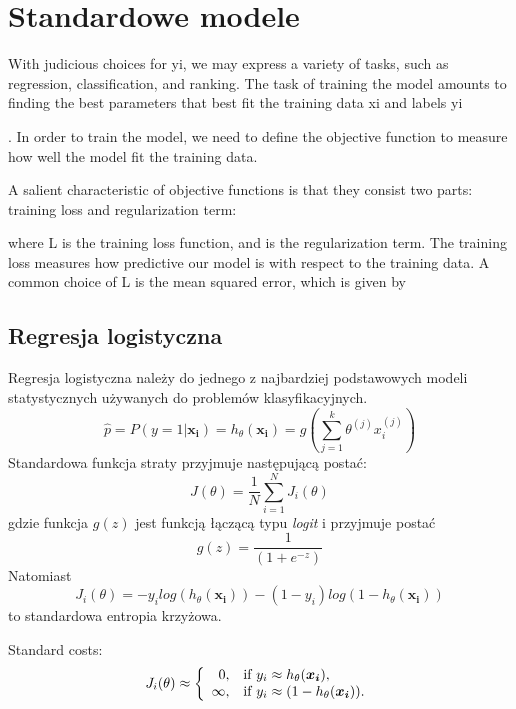\documentclass{book}
\begin{document}

\section{Standardowe modele}

	
	With judicious choices for yi, we may express a variety of tasks, such as regression, classification, and ranking. The task of training the model amounts to finding the best parameters that best fit the training data xi and labels yi
	
	. In order to train the model, we need to define the objective function to measure how well the model fit the training data.
	
	A salient characteristic of objective functions is that they consist two parts: training loss and regularization term:

	
	where L
	is the training loss function, and is the regularization term. The training loss measures how predictive our model is with respect to the training data. A common choice of L is the mean squared error, which is given by

\subsection{Regresja logistyczna}

	Regresja logistyczna należy do jednego z najbardziej podstawowych modeli statystycznych używanych do problemów klasyfikacyjnych. 
	\begin{equation}
		\hat{p} = P(y=1|\boldsymbol{x_i}) = h_{\theta}(\boldsymbol{x_i}) = g\left(\sum_{j=1}^k \theta^{(j)}x_i^{(j)} \right)
	\end{equation} 
	Standardowa funkcja straty przyjmuje następującą postać:
	$$ J(\theta) = \frac{1}{N} \sum_{i=1}^N J_i(\theta) $$
	gdzie funkcja $g(z)$ jest funkcją łączącą typu \textit{logit} i przyjmuje postać 
	$$ g(z) = \frac{1}{(1+e^{-z})} $$
	Natomiast 
	\begin{equation}
	\label{c-e}
		J_i(\theta) = -y_i log(h_{\theta}(\boldsymbol{x_i})) - (1-y_i) log(1 - h_{\theta}(\boldsymbol{x_i}))
	\end{equation}
	$$  $$
	 to standardowa entropia krzyżowa.


    Standard costs:
	$$
	J_i(\theta) \approx \left\{
	\begin{array}{rl}
	0, &\mbox{if $y_i \approx h_{\theta}(\boldsymbol{x_i})$}, \\
	\infty, &\mbox{if $y_i \approx (1 - h_{\theta}(\boldsymbol{x_i}))$}.
	\end{array}{}
	\right.
	$$
	
\end{document}
